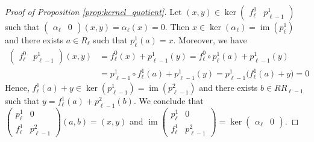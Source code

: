 \documentclass[english,a4paper,nolineno,cleveref]{socg-lipics-v2021}
\DeclareMathOperator{\im}{im}
\begin{document}
\begin{proof}[Proof of Proposition \ref{prop:kernel_quotient}]
Let $(x,y)\in \ker\begin{pmatrix}f^0_\ell & p_{\ell\minus 1}^1\end{pmatrix}$ such that $\begin{pmatrix}\alpha_\ell & 0\end{pmatrix}(x,y)=\alpha_\ell(x)=0$. Then $x\in\ker(\alpha_\ell)=\im(p^1_\ell)$ and there exists $a\in R_\ell$ such that $p^1_\ell(a)=x$. Moreover, we have 
\begin{equation*}
\begin{aligned}
\begin{pmatrix}f^0_\ell & p_{\ell\minus 1}^1\end{pmatrix}(x,y)&=f^0_\ell(x)+p_{\ell\minus 1}^1(y)=f^0_\ell\circ p_\ell^1(a)+p^1_{\ell\minus 1}(y)\\&=p_{\ell\minus 1}^1\circ f^1_\ell(a)+p_{\ell\minus 1}^1(y)=p_{\ell\minus 1}^1\big(f^1_\ell(a)+y\big)=0
\end{aligned}
\end{equation*}
Hence, $f^1_\ell(a)+y\in\ker(p^1_{\ell\minus 1})=\im(p^2_{\ell\minus 1})$ and there exists $b\in RR_{\ell\minus 1}$ such that $y=f^1_\ell(a)+p^2_{\ell\minus 1}(b)$. We conclude that $\begin{pmatrix}p_\ell^1 & 0 \\ f^1_\ell & p_{\ell\minus 1}^2\end{pmatrix}(a,b)=(x,y)$ and $\im\begin{pmatrix}p_\ell^1 & 0 \\ f^1_\ell & p_{\ell\minus 1}^2\end{pmatrix}=\ker\begin{pmatrix}\alpha_\ell & 0\end{pmatrix}$.
\end{proof}

\vspace{5pt}
\end{document}
